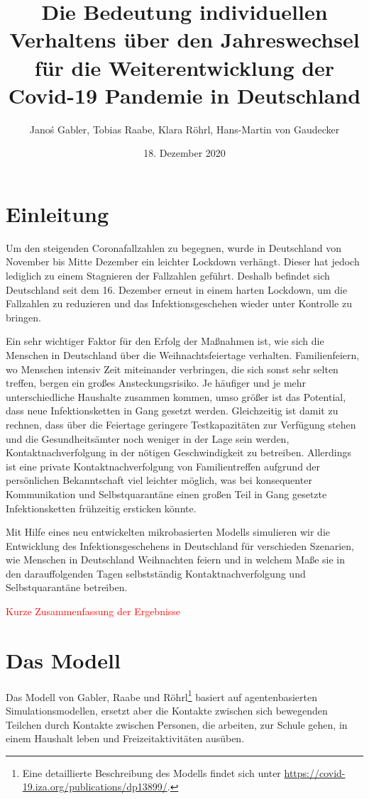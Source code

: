 \documentclass[a4paper,11pt,leqno,fleqn]{article}
\title{Die Bedeutung individuellen Verhaltens über den Jahreswechsel für die Weiterentwicklung der Covid-19 Pandemie in Deutschland}
\date{18. Dezember 2020}
\author{Janoś Gabler, Tobias Raabe, Klara Röhrl, Hans-Martin von Gaudecker}
\begin{document}
\maketitle
{}
\setcounter{page}{1}


\section{Einleitung}

Um den steigenden Coronafallzahlen zu begegnen, wurde in Deutschland von November bis Mitte Dezember ein leichter Lockdown verhängt.
Dieser hat jedoch lediglich zu einem Stagnieren der Fallzahlen geführt.
Deshalb befindet sich Deutschland seit dem 16. Dezember erneut in einem harten Lockdown, um die Fallzahlen zu reduzieren und das Infektionsgeschehen wieder unter Kontrolle zu bringen.

Ein sehr wichtiger Faktor für den Erfolg der Maßnahmen ist, wie sich die Menschen in Deutschland über die Weihnachtsfeiertage verhalten.
Familienfeiern, wo Menschen intensiv Zeit miteinander verbringen, die sich sonst sehr selten treffen, bergen ein großes Ansteckungsrisiko.
Je häufiger und je mehr unterschiedliche Haushalte zusammen kommen, umso größer ist das Potential, dass neue Infektionsketten in Gang gesetzt werden.
Gleichzeitig ist damit zu rechnen, dass über die Feiertage geringere Testkapazitäten zur Verfügung stehen und die Gesundheitsämter noch weniger in der Lage sein werden, Kontaktnachverfolgung in der nötigen Geschwindigkeit zu betreiben.
Allerdings ist eine private Kontaktnachverfolgung von Familientreffen aufgrund der persönlichen Bekanntschaft viel leichter möglich, was bei konsequenter Kommunikation und Selbstquarantäne einen großen Teil in Gang gesetzte Infektionsketten frühzeitig ersticken könnte.

Mit Hilfe eines neu entwickelten mikrobasierten Modells simulieren wir die Entwicklung des Infektionsgeschehens in Deutschland für verschieden Szenarien, wie Menschen in Deutschland Weihnachten feiern und in welchem Maße sie in den darauffolgenden Tagen selbstständig Kontaktnachverfolgung und Selbstquarantäne betreiben.

\textcolor{red}{Kurze Zusammenfassung der Ergebnisse}

\section{Das Modell}

Das Modell von Gabler, Raabe und Röhrl\footnote{Eine detaillierte Beschreibung des Modells findet sich unter \url{https://covid-19.iza.org/publications/dp13899/}.} basiert auf agentenbasierten Simulationsmodellen, ersetzt aber die Kontakte zwischen sich bewegenden Teilchen durch Kontakte zwischen Personen, die arbeiten, zur Schule gehen, in einem Haushalt leben und Freizeitaktivitäten ausüben.
\end{document}
